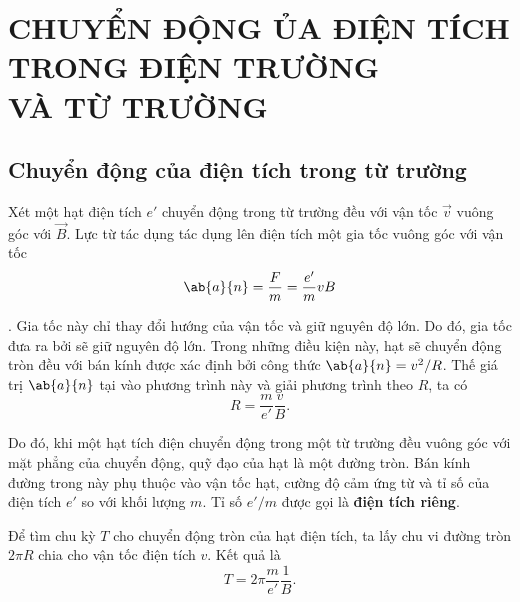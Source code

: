 

\chapter[CHUYỂN ĐỘNG CỦA ĐIỆN TÍCH TRONG ĐIỆN TRƯỜNG\\
VÀ TỪ TRƯỜNG]{CHUYỂN ĐỘNG ỦA ĐIỆN TÍCH \\TRONG ĐIỆN TRƯỜNG\\ VÀ TỪ TRƯỜNG}\label{chap:10}

\section{Chuyển động của điện tích trong từ trường}\label{sec:10_1}

Xét một hạt điện tích $e'$ chuyển động trong từ trường đều với vận tốc $\vec{v}$ vuông góc với $\vec{B}$.
Lực từ tác dụng tác dụng lên điện tích một gia tốc vuông góc với vận tốc
\begin{equation}\label{eq:10_1}
    \ab{a}{n} = \frac{F}{m} = \frac{e'}{m} vB
\end{equation}

.
Gia tốc này chỉ thay đổi hướng của vận tốc và giữ nguyên độ lớn.
Do đó, gia tốc đưa ra bởi  sẽ giữ nguyên độ lớn.
Trong những điều kiện này, hạt sẽ chuyển động tròn đều với bán kính được xác định bởi công thức $\ab{a}{n}=v^2/R$.
Thế giá trị $\ab{a}{n}$ tại  vào phương trình này và giải phương trình theo $R$, ta có
\begin{equation}\label{eq:10_2}
    R = \frac{m}{e'} \frac{v}{B}.
\end{equation}

Do đó, khi một hạt tích điện chuyển động trong một từ trường đều vuông góc với mặt phẳng của chuyển động, quỹ đạo của hạt là một đường tròn.
Bán kính đường trong này phụ thuộc vào vận tốc hạt, cường độ cảm ứng từ và tỉ số của điện tích $e'$ so với khối lượng $m$.
Tỉ số $e'/m$ được gọi là \textbf{điện tích riêng}.

Để tìm chu kỳ $T$ cho chuyển động tròn của hạt điện tích,
ta lấy chu vi đường tròn $2\pi R$ chia cho vận tốc điện tích $v$. Kết quả là
\begin{equation}\label{eq:10_3}
    T = 2\pi \frac{m}{e'} \frac{1}{B}.
\end{equation}

